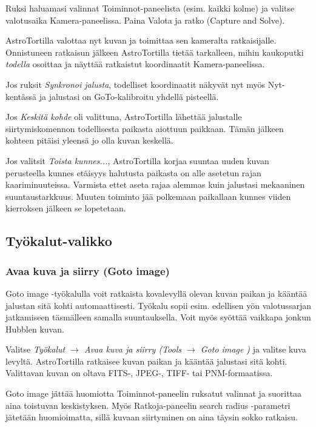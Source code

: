\documentclass{article}
\begin{document}
Ruksi haluamasi valinnat Toiminnot-paneelista (esim. kaikki kolme) ja valitse valotusaika Kamera-paneelissa.
Paina Valota ja ratko (Capture and Solve).

AstroTortilla valottaa nyt kuvan ja toimittaa sen kameralta ratkaisijalle. Onnistuneen
ratkaisun jälkeen AstroTortilla tietää tarkalleen, mihin kaukoputki \emph{todella} osoittaa ja näyttää
ratkaistut koordinaatit Kamera-paneelissa.

Jos ruksit \emph{Synkronoi jalusta}, todelliset koordinaatit näkyvät nyt myös Nyt-kentässä ja jalustasi on GoTo-kalibroitu yhdellä pisteellä.

Jos \emph{Keskitä kohde} oli valittuna, AstroTortilla lähettää jalustalle siirtymiskomennon todellisesta paikasta aiottuun paikkaan. Tämän jälkeen kohteen pitäisi yleensä jo olla kuvan keskellä.

Jos valitsit \emph{Toista kunnes...}, AstroTortilla korjaa suuntaa uuden kuvan perusteella kunnes etäisyys halutusta paikasta on alle asetetun rajan kaariminuuteissa. Varmista ettet aseta rajaa alemmas kuin jalustasi mekaaninen suuntaustarkkuus. Muuten toiminto jää polkemaan paikallaan kunnes viiden kierroksen jälkeen se lopetetaan.

\subsection{Työkalut-valikko}

\subsubsection{Avaa kuva ja siirry (Goto image)}

Goto image -työkalulla voit ratkaista kovalevyllä olevan kuvan paikan ja kääntää jalustan sitä kohti automaattisesti.
Työkalu sopii esim. edellisen yön valotussarjan jatkamiseen täsmälleen samalla suuntauksella. Voit myös syöttää vaikkapa jonkun Hubblen kuvan.

Valitse \emph{Työkalut $\rightarrow$ Avaa kuva ja siirry (Tools $\rightarrow$ Goto image )} ja valitse kuva levyltä.
AstroTortilla ratkaisee kuvan paikan ja kääntää jalustasi sitä kohti. Valittavan kuvan on oltava FITS-, JPEG-, TIFF-
tai PNM-formaatissa.

Goto image jättää huomiotta Toiminnot-paneelin ruksatut valinnat ja suorittaa aina toistuvan keskistyksen.
Myös Ratkoja-paneelin search radius -parametri jätetään huomioimatta, sillä kuvaan siirtyminen on aina täysin sokko ratkaisu.
\end{document}
